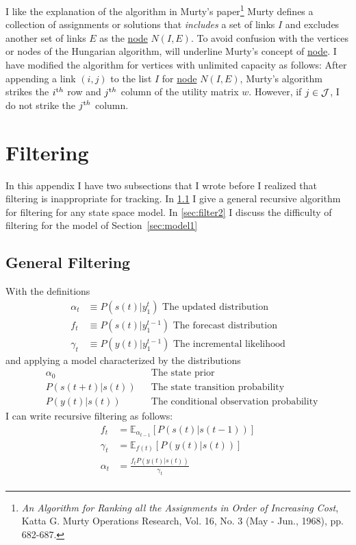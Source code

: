 \documentclass[12pt]{article}
\newcommand{\field}[1]{\mathbb{#1}}
\newcommand{\EV}[2]{\field{E}_{#1}\left[#2\right]}
\newcommand{\ti}[2]{{#1}{(#2)}}                         %
\newcommand{\ts}[4]{{#1}_{#3}^{#4}} %
\begin{document}
I like the explanation of the algorithm in Murty's
paper\footnote{\emph{An Algorithm for Ranking all the Assignments in
    Order of Increasing Cost}, Katta G.  Murty Operations Research,
  Vol. 16, No. 3 (May - Jun., 1968), pp.  682-687.}  Murty defines a
collection of assignments or solutions that \emph{includes} a set of
links $I$ and excludes another set of links $E$ as the
\underline{node} $N(I,E)$.  To avoid confusion with the vertices or
nodes of the Hungarian algorithm, will underline Murty's concept of
\underline{node}.  I have modified the algorithm for vertices with
unlimited capacity as follows: After appending a link $(i,j)$ to the
list $I$ for \underline{node} $N(I,E)$, Murty's algorithm strikes the
$i^{\text th}$ row and $j^{\text th}$ column of the utility matrix
$w$.  However, if $j\in {\cal J}$, I do not strike the $j^{\text th}$
column.

\section{Filtering}
\label{sec:filtering}

In this appendix I have two subsections that I wrote before I
realized that filtering is inappropriate for tracking.  In
\ref{sec:filtering1} I give a general recursive algorithm for filtering
for any state space model.  In \ref{sec:filter2} I discuss the
difficulty of filtering for the model of Section~\ref{sec:model1}

\subsection{General Filtering}
\label{sec:filtering1}

With the definitions
\begin{align}
  \label{def:alpha}
  \alpha_t &\equiv P(\ti{s}{t}|\ts{y}{\tau}{1}{t}) \text{ The updated distribution} \\
  f_t &\equiv P(\ti{s}{t}|\ts{y}{\tau}{1}{t-1}) \text{ The forecast
    distribution} \\
  \gamma_t &\equiv P(\ti{y}{t}|\ts{y}{\tau}{1}{t-1}) \text{ The
    incremental likelihood}
\end{align}
and applying a model characterized by the distributions
\begin{align}
  \label{def:alpha0}
  &\alpha_0  &&\text{The state prior} \\
  &P(\ti{s}{t+t}|\ti{s}{t}) &&\text{The state transition probability} \\
  &P(\ti{y}{t}|\ti{s}{t}) &&\text{The conditional observation probability}
\end{align}
I can write recursive filtering as follows:
\begin{align}
  f_t &= \EV{\alpha_{t-1}} {P(\ti{s}{t}|\ti{s}{t-1})} \\
  \gamma_t &= \EV{\ti{f}{t}} {P(\ti{y}{t}|\ti{s}{t})} \\
  \alpha_t &= \frac{f_t P(\ti{y}{t}|\ti{s}{t})}{\gamma_t} \\
\end{align}
\end{document}
